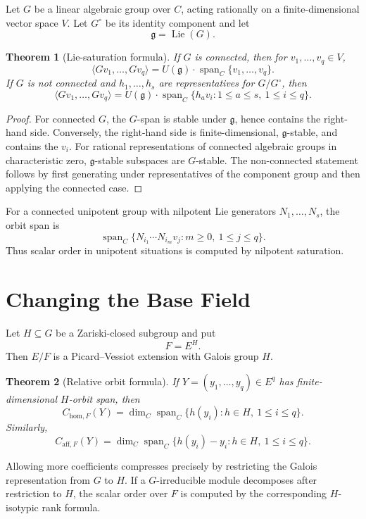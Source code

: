 \documentclass[11pt]{article}
\newtheorem{theorem}{Theorem}[section]
\DeclareMathOperator{\Span}{span}
\DeclareMathOperator{\Lie}{Lie}
\begin{document}
Let \(G\) be a linear algebraic group over \(C\), acting rationally on a finite-dimensional vector space \(V\). Let \(G^\circ\) be its identity component and let
\[
\mathfrak g=\Lie(G).
\]

\begin{theorem}[Lie-saturation formula]
If \(G\) is connected, then for \(v_1,\ldots,v_q\in V\),
\[
\langle Gv_1,\ldots,Gv_q\rangle
=
U(\mathfrak g)\cdot\Span_C\{v_1,\ldots,v_q\}.
\]
If \(G\) is not connected and \(h_1,\ldots,h_s\) are representatives for \(G/G^\circ\), then
\[
\langle Gv_1,\ldots,Gv_q\rangle
=
U(\mathfrak g)\cdot
\Span_C\{h_a v_i:1\le a\le s,\ 1\le i\le q\}.
\]
\end{theorem}

\begin{proof}
For connected \(G\), the \(G\)-span is stable under \(\mathfrak g\), hence contains the right-hand side. Conversely, the right-hand side is finite-dimensional, \(\mathfrak g\)-stable, and contains the \(v_i\). For rational representations of connected algebraic groups in characteristic zero, \(\mathfrak g\)-stable subspaces are \(G\)-stable. The non-connected statement follows by first generating under representatives of the component group and then applying the connected case.
\end{proof}

For a connected unipotent group with nilpotent Lie generators \(N_1,\ldots,N_s\), the orbit span is
\[
\Span_C\{N_{i_1}\cdots N_{i_m}v_j:m\ge0,\ 1\le j\le q\}.
\]
Thus scalar order in unipotent situations is computed by nilpotent saturation.

\section{Changing the Base Field}

Let \(H\subseteq G\) be a Zariski-closed subgroup and put
\[
F=E^H.
\]
Then \(E/F\) is a Picard--Vessiot extension with Galois group \(H\).

\begin{theorem}[Relative orbit formula]
If \(Y=(y_1,\ldots,y_q)\in E^q\) has finite-dimensional \(H\)-orbit span, then
\[
C_{\mathrm{hom},F}(Y)
=
\dim_C\Span_C\{h(y_i):h\in H,\ 1\le i\le q\}.
\]
Similarly,
\[
C_{\mathrm{aff},F}(Y)
=
\dim_C\Span_C\{h(y_i)-y_i:h\in H,\ 1\le i\le q\}.
\]
\end{theorem}

Allowing more coefficients compresses precisely by restricting the Galois representation from \(G\) to \(H\). If a \(G\)-irreducible module decomposes after restriction to \(H\), the scalar order over \(F\) is computed by the corresponding \(H\)-isotypic rank formula.
\end{document}
